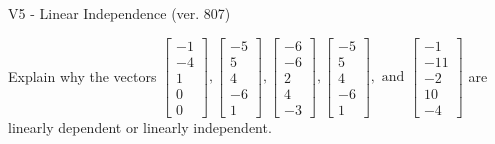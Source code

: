 \begin{exercise}
  \begin{exerciseTitle}V5 - Linear Independence (ver. 807)\end{exerciseTitle}
  \begin{exerciseStatement}
    Explain why the vectors \(\left[\begin{array}{r}
-1 \\
-4 \\
1 \\
0 \\
0
\end{array}\right] , \left[\begin{array}{r}
-5 \\
5 \\
4 \\
-6 \\
1
\end{array}\right] , \left[\begin{array}{r}
-6 \\
-6 \\
2 \\
4 \\
-3
\end{array}\right] , \left[\begin{array}{r}
-5 \\
5 \\
4 \\
-6 \\
1
\end{array}\right] , \text{ and } \left[\begin{array}{r}
-1 \\
-11 \\
-2 \\
10 \\
-4
\end{array}\right]\) are linearly dependent or linearly independent.	



\end{exerciseStatement}
\end{exercise}
